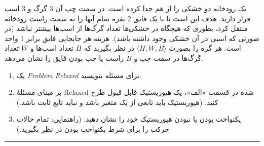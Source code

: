 \documentclass[a4paper,10pt]{article}
\begin{document}
یک رودخانه دو خشکی را از هم جدا کرده است. در سمت چپ آن 3 گرگ و 3 اسب قرار دارند. هدف این است تا با یک قایق 2 نفره تمام آنها را به سمت راست رودخانه منتقل کرد، بطوری که هیچگاه در خشکی‌ها تعداد گرگ‌ها از اسب‌ها بیشتر نباشد (در صورتی که اسبی در آن خشکی وجود داشته باشد). هزینه هر جابجایی قایق برابر 1 واحد است. هر گره را بصورت $\langle H,W,B\rangle$ در نظر بگیرید که $H$ تعداد اسب‌ها و $W$ تعداد گرگ‌ها در سمت چپ و $B$ راست یا چپ بودن قایق را نشان می‌دهد.

\begin{enumerate}[label=\alph*-]
    \item یک \emph{Problem Relaxed} برای مسئله بنویسید.
    \item بر مبنای مسئلۀ Relaxed شده در قسمت «الف»، یک هیوریستیک قابل قبول طرح کنید. (هیوریستیک باید تابعی از یک متغیر باشد و نباید تابع ثابت باشد.)
    \item یکنواخت بودن یا نبودن هیوریستیک خود را نشان دهید. (راهنمایی: تمام حالات حرکت را برای شرط یکنواخت بودن در نظر بگیرید.)
\end{enumerate}


\bigskip
\rule{\linewidth}{0.4pt}

\end{document}

